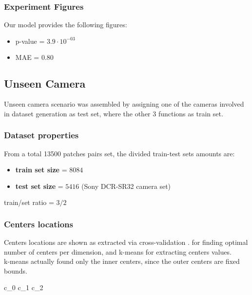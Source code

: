 	\subsubsection{Experiment Figures}
	
	Our model provides the following figures:

	\begin{itemize}
	\item 	p-value = $3.9 \cdot 10 ^{-03}$
	\item 	MAE = $0.80$
	
	\end{itemize}


\subsection{Unseen Camera}

Unseen camera scenario was assembled by assigning one of the cameras involved in dataset generation as test set, where the other 3 functions as train set.


	\subsubsection{Dataset properties}
	
		From a total 13500 patches pairs set, the divided train-test sets amounts are:
		\begin{itemize}
			\item \textbf{train set size} = $8084$ 
			\item \textbf{test set size} = $5416$ (Sony DCR-SR32 camera set)
		\end{itemize}
		
		train/set ratio = $3/2$

	\subsubsection{Centers locations}
	
	Centers locations are shown as extracted via cross-validation \cite{cross_val}. for finding optimal number of centers per dimension, and k-means for extracting centers values.\\
	k-means actually found only the inner centers, since the outer centers are fixed bounds.

	\vskip30pt
	\begin{matrix}  \qquad  c_0 \quad  \qquad c_1 \quad  \qquad c_2 \end{matrix}
			
